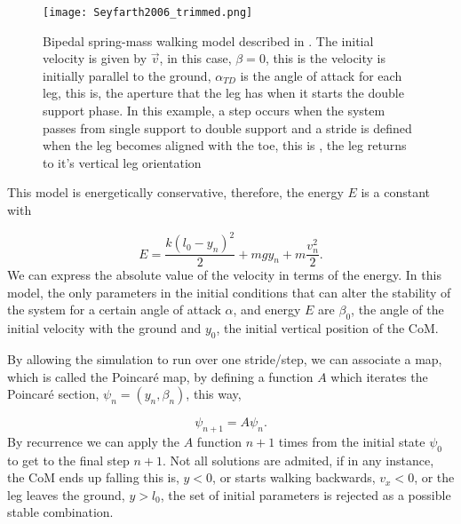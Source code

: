 \begin{figure}[H]
\centering
\texttt{[image: Seyfarth2006\_trimmed.png]}
\caption{Bipedal spring-mass walking model described in \cite{Seyfarth2006}. The initial velocity is given by $\vec{v}$, in this case, $\beta=0$, this is the velocity is initially parallel to the ground, $\alpha_{TD}$ is the angle of attack for each leg, this is, the aperture that the leg has when it starts the double support phase. In this example, a step occurs when the system passes from single support to double support and a stride is defined when the leg  becomes aligned with the toe, this is , the leg returns to it's vertical leg orientation}
\label{Seyfarthmodel}
\end{figure}


This model is energetically conservative, therefore, the energy $E$ is a constant with

\begin{equation}
  E=\frac{k (l_0-y_n)^2}{2} + m g y_n + m \frac{v_n^2}{2}.
\end{equation}
\noindent We can express the absolute value of the velocity in terms of the energy. In this model, the only parameters in the initial conditions that can alter the stability of the system for a certain angle of attack $\alpha$, and energy $E$ are $\beta_0$, the angle of the initial velocity with the ground and $y_0$, the initial vertical position of the CoM.

By allowing the simulation to run over one stride/step, we can associate a map, which is called the Poincaré map, by defining a function $A$ which iterates the Poincaré section, $\psi_n=(y_n,\beta_n)$, this way,

\begin{equation}
  \psi_{n+1}=A \psi_n.
\end{equation}
By recurrence we can apply the $A$ function $n+1$ times from the initial state $\psi_0$ to get to the final step $n+1$.
Not all solutions are admited, if in any instance, the CoM ends up falling this is, $y<0$, or starts walking backwards, $v_x<0$, or the leg leaves the ground, $y>l_0$, the set of initial parameters is rejected as a possible stable combination.







